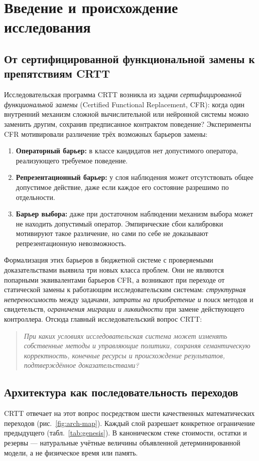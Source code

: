 \documentclass[10pt,a4paper]{article}
\begin{document}
\section{Введение и происхождение исследования}
\label{sec:intro}
\subsection{От сертифицированной функциональной замены к препятствиям CRTT}
Исследовательская программа CRTT возникла из задачи \emph{сертифицированной функциональной замены} (Certified Functional Replacement, CFR): когда один внутренний механизм сложной вычислительной или нейронной системы можно заменить другим, сохранив предписанное контрактом поведение? Эксперименты CFR мотивировали различение трёх возможных барьеров замены:
\begin{enumerate}
    \item \textbf{Операторный барьер:} в классе кандидатов нет допустимого оператора, реализующего требуемое поведение.
    \item \textbf{Репрезентационный барьер:} у слоя наблюдения может отсутствовать общее допустимое действие, даже если каждое его состояние разрешимо по отдельности.
    \item \textbf{Барьер выбора:} даже при достаточном наблюдении механизм выбора может не находить допустимый оператор. Эмпирические сбои калибровки мотивируют такое различение, но сами по себе не доказывают репрезентационную невозможность.
\end{enumerate}

Формализация этих барьеров в бюджетной системе с проверяемыми доказательствами выявила три новых класса проблем. Они не являются попарными эквивалентами барьеров CFR, а возникают при переходе от статической замены к работающим исследовательским системам: \emph{структурная непереносимость} между задачами, \emph{затраты на приобретение и поиск} методов и свидетельств, \emph{ограничения миграции и ликвидности} при замене действующего контроллера. Отсюда главный исследовательский вопрос CRTT:
\begin{quote}
\emph{При каких условиях исследовательская система может изменять собственные методы и управляющие политики, сохраняя семантическую корректность, конечные ресурсы и происхождение результатов, подтверждённое доказательствами?}
\end{quote}

\subsection{Архитектура как последовательность переходов}
CRTT отвечает на этот вопрос посредством шести качественных математических переходов (рис.~\ref{fig:arch-map}). Каждый слой разрешает конкретное ограничение предыдущего (табл.~\ref{tab:genesis}). В каноническом стеке стоимости, остатки и резервы --- натуральные учётные величины объявленной детерминированной модели, а не физическое время или память.
\end{document}
